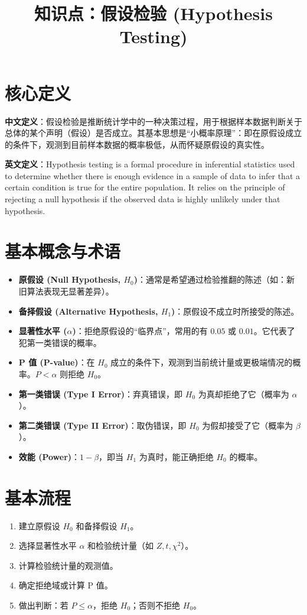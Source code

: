\documentclass[12pt, a4paper]{article}
\title{知识点：假设检验 (Hypothesis Testing)}
\author{}
\date{}
\begin{document}
\maketitle

\section{核心定义}
\textbf{中文定义}：假设检验是推断统计学中的一种决策过程，用于根据样本数据判断关于总体的某个声明（假设）是否成立。其基本思想是“小概率原理”：即在原假设成立的条件下，观测到目前样本数据的概率极低，从而怀疑原假设的真实性。

\textbf{英文定义}：Hypothesis testing is a formal procedure in inferential statistics used to determine whether there is enough evidence in a sample of data to infer that a certain condition is true for the entire population. It relies on the principle of rejecting a null hypothesis if the observed data is highly unlikely under that hypothesis.

\section{基本概念与术语}

\begin{itemize}
    \item \textbf{原假设 (Null Hypothesis, $H_0$)}：通常是希望通过检验推翻的陈述（如：新旧算法表现无显著差异）。
    \item \textbf{备择假设 (Alternative Hypothesis, $H_1$)}：原假设不成立时所接受的陈述。
    \item \textbf{显著性水平 ($\alpha$)}：拒绝原假设的“临界点”，常用的有 $0.05$ 或 $0.01$。它代表了犯第一类错误的概率。
    \item \textbf{P 值 (P-value)}：在 $H_0$ 成立的条件下，观测到当前统计量或更极端情况的概率。$P < \alpha$ 则拒绝 $H_0$。
    \item \textbf{第一类错误 (Type I Error)}：弃真错误，即 $H_0$ 为真却拒绝了它（概率为 $\alpha$）。
    \item \textbf{第二类错误 (Type II Error)}：取伪错误，即 $H_0$ 为假却接受了它（概率为 $\beta$）。
    \item \textbf{效能 (Power)}：$1 - \beta$，即当 $H_1$ 为真时，能正确拒绝 $H_0$ 的概率。
\end{itemize}

\section{基本流程}
\begin{enumerate}
    \item 建立原假设 $H_0$ 和备择假设 $H_1$。
    \item 选择显著性水平 $\alpha$ 和检验统计量（如 $Z, t, \chi^2$）。
    \item 计算检验统计量的观测值。
    \item 确定拒绝域或计算 P 值。
    \item 做出判断：若 $P \le \alpha$，拒绝 $H_0$；否则不拒绝 $H_0$。
\end{enumerate}
\end{document}

